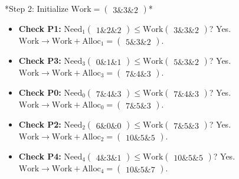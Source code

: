 \documentclass[12pt,a4paper]{article}
\begin{document}
\begin{tcolorbox}[exambox, title={\textbf{Frequently Asked / Viva Questions}}]
\begin{enumerate}[topsep=0pt, label=\textbf{Q\arabic*.}, itemsep=5pt]
    *Step 2: Initialize $\text{Work} = \begin{pmatrix} 3 \& 3 \& 2 \end{pmatrix}$*\par
    \begin{itemize}[leftmargin=*, itemsep=2.5pt, topsep=2pt]
      \item \textbf{Check P1:} $\text{Need}_1 \begin{pmatrix} 1 \& 2 \& 2 \end{pmatrix} \le \text{Work} \begin{pmatrix} 3 \& 3 \& 2 \end{pmatrix}$? Yes. $\text{Work} \to \text{Work} + \text{Alloc}_1 = \begin{pmatrix} 5 \& 3 \& 2 \end{pmatrix}$.
      \item \textbf{Check P3:} $\text{Need}_3 \begin{pmatrix} 0 \& 1 \& 1 \end{pmatrix} \le \text{Work} \begin{pmatrix} 5 \& 3 \& 2 \end{pmatrix}$? Yes. $\text{Work} \to \text{Work} + \text{Alloc}_3 = \begin{pmatrix} 7 \& 4 \& 3 \end{pmatrix}$.
      \item \textbf{Check P0:} $\text{Need}_0 \begin{pmatrix} 7 \& 4 \& 3 \end{pmatrix} \le \text{Work} \begin{pmatrix} 7 \& 4 \& 3 \end{pmatrix}$? Yes. $\text{Work} \to \text{Work} + \text{Alloc}_0 = \begin{pmatrix} 7 \& 5 \& 3 \end{pmatrix}$.
      \item \textbf{Check P2:} $\text{Need}_2 \begin{pmatrix} 6 \& 0 \& 0 \end{pmatrix} \le \text{Work} \begin{pmatrix} 7 \& 5 \& 3 \end{pmatrix}$? Yes. $\text{Work} \to \text{Work} + \text{Alloc}_2 = \begin{pmatrix} 10 \& 5 \& 5 \end{pmatrix}$.
      \item \textbf{Check P4:} $\text{Need}_4 \begin{pmatrix} 4 \& 3 \& 1 \end{pmatrix} \le \text{Work} \begin{pmatrix} 10 \& 5 \& 5 \end{pmatrix}$? Yes. $\text{Work} \to \text{Work} + \text{Alloc}_4 = \begin{pmatrix} 10 \& 5 \& 7 \end{pmatrix}$.

\end{itemize}
\end{enumerate}
\end{tcolorbox}
\end{document}
